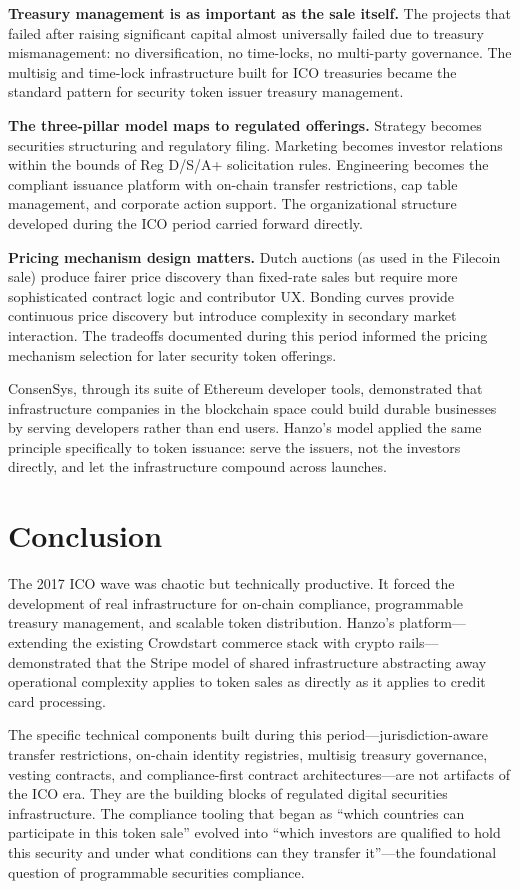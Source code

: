 \documentclass[11pt,letterpaper]{article}
\begin{document}
\textbf{Treasury management is as important as the sale itself.} The
projects that failed after raising significant capital almost universally
failed due to treasury mismanagement: no diversification, no time-locks, no
multi-party governance. The multisig and time-lock infrastructure built for
ICO treasuries became the standard pattern for security token issuer
treasury management.

\textbf{The three-pillar model maps to regulated offerings.} Strategy
becomes securities structuring and regulatory filing. Marketing becomes
investor relations within the bounds of Reg D/S/A+ solicitation rules.
Engineering becomes the compliant issuance platform with on-chain transfer
restrictions, cap table management, and corporate action support. The
organizational structure developed during the ICO period carried forward
directly.

\textbf{Pricing mechanism design matters.} Dutch auctions (as used in the
Filecoin sale) produce fairer price discovery than fixed-rate sales but require
more sophisticated contract logic and contributor UX. Bonding curves provide
continuous price discovery but introduce complexity in secondary market
interaction. The tradeoffs documented during this period informed the pricing
mechanism selection for later security token offerings.

ConsenSys, through its suite of Ethereum developer tools, demonstrated that
infrastructure companies in the blockchain space could build durable businesses
by serving developers rather than end users. Hanzo's model applied the same
principle specifically to token issuance: serve the issuers, not the investors
directly, and let the infrastructure compound across launches.

\section{Conclusion}
\label{sec:conclusion}

The 2017 ICO wave was chaotic but technically productive. It forced the
development of real infrastructure for on-chain compliance, programmable
treasury management, and scalable token distribution. Hanzo's platform---
extending the existing Crowdstart commerce stack with crypto rails---
demonstrated that the Stripe model of shared infrastructure abstracting away
operational complexity applies to token sales as directly as it applies to
credit card processing.

The specific technical components built during this period---jurisdiction-aware
transfer restrictions, on-chain identity registries, multisig treasury
governance, vesting contracts, and compliance-first contract architectures---are
not artifacts of the ICO era. They are the building blocks of regulated digital
securities infrastructure. The compliance tooling that began as ``which
countries can participate in this token sale'' evolved into ``which investors
are qualified to hold this security and under what conditions can they
transfer it''---the foundational question of programmable securities compliance.
\end{document}

